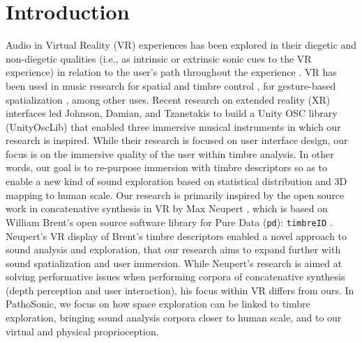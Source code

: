 \documentclass{nime-alternate}
\begin{document}
\section{Introduction}



Audio in Virtual Reality (VR) experiences has been explored in their diegetic and non-diegetic qualities (i.e., as intrinsic or extrinsic sonic cues to the VR experience) in relation to the user's path throughout the experience \cite{anil_camci_2019_3249315}. VR has been used in music research for spatial and timbre control \cite{rgraham2017}, for gesture-based spatialization \cite{giovanni_santini_2019_3249329}, among other uses. Recent research on extended reality (XR) interfaces led Johnson, Damian, and Tzanetakis \cite{david_johnson_2019_3249319} to build a Unity OSC library (UnityOscLib) that enabled three immersive musical instruments in which our research is inspired. While their research is focused on user interface design, our focus is on the immersive quality of the user within timbre analysis. In other words, our goal is to re-purpose immersion with timbre descriptors so as to enable a new kind of sound exploration based on statistical distribution and 3D mapping to human scale. Our research is primarily inspired by the open source work in concatenative synthesis in VR by Max Neupert \cite{neupert2017}, which is based on William Brent's open source software library for Pure Data (\texttt{pd}): \texttt{timbreID} \cite{icmc/bbp2372.2010.044}. Neupert's VR display of Brent’s timbre descriptors enabled a novel approach to sound analysis and exploration, that our research aims to expand further with sound spatialization and user immersion. While Neupert's research is aimed at solving performative issues when performing corpora of concatenative synthesis (depth perception and user interaction), his focus within VR differs from ours. In PathoSonic, we focus on how space exploration can be linked to timbre exploration, bringing sound analysis corpora closer to human scale, and to our virtual and physical proprioception. 
\end{document}
